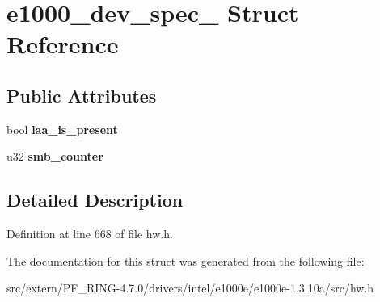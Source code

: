 \hypertarget{structe1000__dev__spec__82571}{
\section{e1000\_\-dev\_\-spec\_ Struct Reference}
\label{structe1000__dev__spec__82571}
}
\subsection*{Public Attributes}
\begin{DoxyCompactItemize}
\item 
\hypertarget{structe1000__dev__spec__82571_a21fe05d4a053dfd1dd34c5b64c6c32af}{
bool {\bfseries laa\_\-is\_\-present}}
\label{structe1000__dev__spec__82571_a21fe05d4a053dfd1dd34c5b64c6c32af}

\item 
\hypertarget{structe1000__dev__spec__82571_ac027eadf49008cc3f01505fb50c1881b}{
u32 {\bfseries smb\_\-counter}}
\label{structe1000__dev__spec__82571_ac027eadf49008cc3f01505fb50c1881b}

\end{DoxyCompactItemize}


\subsection{Detailed Description}


Definition at line 668 of file hw.h.



The documentation for this struct was generated from the following file:\begin{DoxyCompactItemize}
\item 
src/extern/PF\_\-RING-\/4.7.0/drivers/intel/e1000e/e1000e-\/1.3.10a/src/hw.h\end{DoxyCompactItemize}
